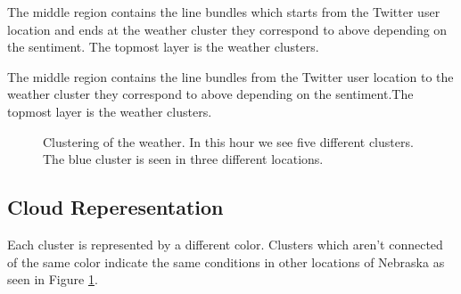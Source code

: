 \documentclass[journal]{vgtc}                %
\begin{document}
The middle region contains the line bundles which starts from the Twitter user location and ends at the weather cluster they correspond to above depending on the sentiment. The topmost layer is the weather clusters.

The middle region contains the line bundles from the Twitter user location to the weather cluster they correspond to above depending on the sentiment.The topmost layer is the weather clusters.

\begin{figure}[htp]
  \centering
  \quad
\caption{Clustering of the weather. In this hour we see five different clusters. The blue cluster is seen in three different locations.}
\label{fig:blur}
\end{figure}

\subsection{Cloud Reperesentation}
Each cluster is represented by a different color. Clusters which aren't connected of the same color indicate the same conditions in other locations of Nebraska as seen in Figure \ref{fig:blur}.
\end{document}

